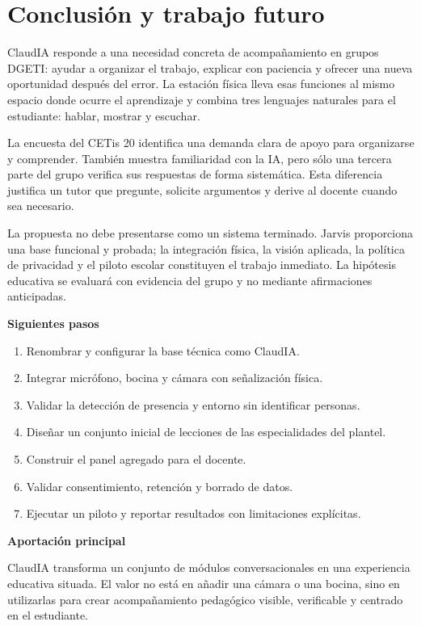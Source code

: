 \documentclass[letterpaper,11pt]{article}
\newcommand{\shortsection}[1]{\par\noindent\textbf{\fontsize{11}{19}\selectfont #1}\par}
\begin{document}
\clearpage

\section{Conclusión y trabajo futuro}

ClaudIA responde a una necesidad concreta de acompañamiento en grupos DGETI: ayudar a organizar el trabajo, explicar con paciencia y ofrecer una nueva oportunidad después del error. La estación física lleva esas funciones al mismo espacio donde ocurre el aprendizaje y combina tres lenguajes naturales para el estudiante: hablar, mostrar y escuchar.

La encuesta del CETis 20 identifica una demanda clara de apoyo para organizarse y comprender. También muestra familiaridad con la IA, pero sólo una tercera parte del grupo verifica sus respuestas de forma sistemática. Esta diferencia justifica un tutor que pregunte, solicite argumentos y derive al docente cuando sea necesario.

La propuesta no debe presentarse como un sistema terminado. Jarvis proporciona una base funcional y probada; la integración física, la visión aplicada, la política de privacidad y el piloto escolar constituyen el trabajo inmediato. La hipótesis educativa se evaluará con evidencia del grupo y no mediante afirmaciones anticipadas.

\shortsection{Siguientes pasos}
\begin{enumerate}
  \item Renombrar y configurar la base técnica como ClaudIA.
  \item Integrar micrófono, bocina y cámara con señalización física.
  \item Validar la detección de presencia y entorno sin identificar personas.
  \item Diseñar un conjunto inicial de lecciones de las especialidades del plantel.
  \item Construir el panel agregado para el docente.
  \item Validar consentimiento, retención y borrado de datos.
  \item Ejecutar un piloto y reportar resultados con limitaciones explícitas.
\end{enumerate}

\shortsection{Aportación principal}
ClaudIA transforma un conjunto de módulos conversacionales en una experiencia educativa situada. El valor no está en añadir una cámara o una bocina, sino en utilizarlas para crear acompañamiento pedagógico visible, verificable y centrado en el estudiante.
\end{document}
